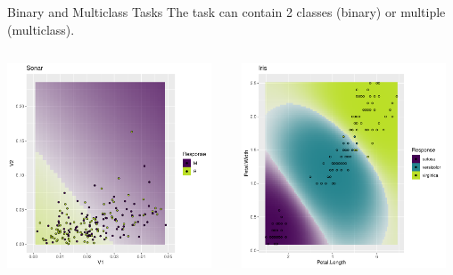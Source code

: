 \documentclass[11pt,compress,t,notes=noshow, xcolor=table]{beamer}
\begin{document}
\begin{vbframe}{Binary and Multiclass Tasks}
The task can contain 2 classes (binary) or multiple (multiclass).
\begin{columns}[T]
  \begin{column}{0.5\textwidth}
\scriptsize
{}\color{fgcolor}

{\centering \includegraphics[width=0.95\textwidth]{figure/reg_class_task_1}

}




  \end{column}
  \begin{column}{0.5\textwidth}
\scriptsize
{}\color{fgcolor}

{\centering \includegraphics[width=0.95\textwidth]{figure/reg_class_task_2}

}
\end{column}
\end{columns}
\end{vbframe}
\end{document}
